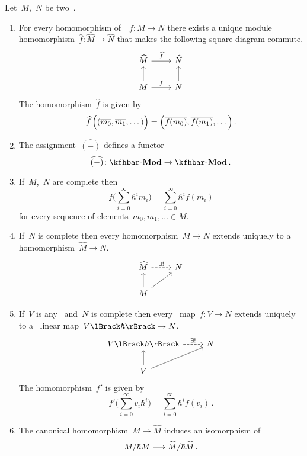 \documentclass[a4paper, 11pt, oneside]{scrartcl}
\begin{document}
\begin{proposition}
  \label{properties of completions}
  Let~$M$,~$N$ be two~\modules{$\kfhbar$}.
  \begin{enumerate}
    \item
      For every homomorphism of~\modules{$\kfhbar$}~$f \colon M \to N$ there exists a unique module homomorphism~$\widehat{f} \colon \widehat{M} \to \widehat{N}$ that makes the following square diagram commute.
      \[
        \begin{tikzcd}
          \widehat{M}
          \arrow{r}[above]{\widehat{f}}
          &
          \widehat{N}
          \\
          M
          \arrow{u}
          \arrow{r}[above]{f}
          &
          N
          \arrow{u}
        \end{tikzcd}
      \]
      The homomorphism~$\widehat{f}$ is given by
      \[
        \widehat{f} \, \Bigl( (\overline{m_0}, \overline{m_1}, \dotsc) \Bigr)
        =
        \Bigl( \overline{f(m_0)}, \overline{f(m_1)}, \dotsc \Bigr) \,.
      \]
    \item
      The assignment~$\widehat{(-)}$ defines a functor
      \[
        \widehat{(-)}
        \colon
        \Mod{\kfhbar}
        \to
        \Mod{\kfhbar} \,.
      \]
    \item
      If~$M$,~$N$ are complete then
      \[
        f\Biggl( \sum_{i=0}^\infty \hbar^i m_i \Biggr)
        =
        \sum_{i=0}^\infty \hbar^i f(m_i)
      \]
      for every sequence of elements~$m_0, m_1, \dotsc \in M$.
    \item
      If~$N$ is complete then every homomorphism~$M \to N$ extends uniquely to a homomorphism~$\widehat{M} \to N$.
      \[
        \begin{tikzcd}
          \widehat{M}
          \arrow[dashed]{r}[above]{\exists!}
          &
          N
          \\
          M
          \arrow{u}
          \arrow{ur}
          &
          {}
        \end{tikzcd}
      \]
    \item
      If~$V$ is any~\vectorspace{$\kf$} and~$N$ is complete then every~\linear{$\kf$} map~$f \colon V \to N$ extends uniquely to a~\linear{$\kfhbar$} linear map~$\power{V}{\hbar} \to N$.
      \[
        \begin{tikzcd}
          \power{V}{\hbar}
          \arrow[dashed]{r}[above]{\exists!}
          &
          N
          \\
          V
          \arrow{u}
          \arrow{ur}
          &
          {}
        \end{tikzcd}
      \]
      The homomorphism~$f'$ is given by
      \[
        f'\Biggl( \sum_{i=0}^\infty v_i \hbar^i \Biggr)
        =
        \sum_{i=0}^\infty \hbar^i f(v_i) \,.
      \]
    \item
      The canonical homomorphism~$M \to \widehat{M}$ induces an isomorphism of~\vectorspaces{$\kf$}
      \[
        M / \hbar M
        \longrightarrow
        \widehat{M} / \hbar \widehat{M} \,.
      \]
  \end{enumerate}
\end{proposition}
\end{document}
